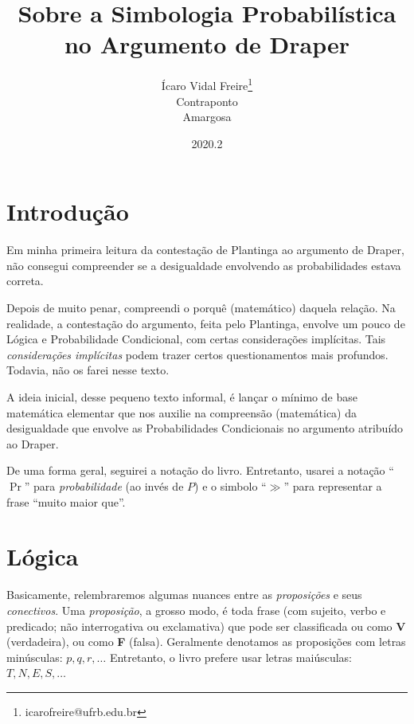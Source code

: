 \documentclass[12pt]{article}
\title
 {
  \textbf{Sobre a Simbologia Probabilística no Argumento de Draper}
 }
\author
 {
	 Ícaro Vidal Freire\thanks{icarofreire@ufrb.edu.br}\\
		Contraponto\\ 
		Amargosa
	}
\date{2020.2}
\theoremstyle{definition}
\begin{document}
\maketitle
%
 \tableofcontents
	\newpage

\section{Introdução}
Em minha primeira leitura da contestação de Plantinga ao argumento de Draper,
não consegui compreender se a desigualdade envolvendo as probabilidades estava 
correta.

Depois de muito penar, compreendi o porquê (matemático) daquela relação.
Na realidade, a contestação do argumento, feita pelo Plantinga, envolve um pouco
de Lógica e Probabilidade Condicional, com certas considerações implícitas.
Tais \textit{considerações implícitas} podem trazer certos questionamentos mais
profundos.
Todavia, não os farei nesse texto.

A ideia inicial, desse pequeno texto informal, é lançar o mínimo de base 
matemática elementar que nos auxilie na compreensão (matemática) da desigualdade
que envolve as Probabilidades Condicionais no argumento atribuído ao Draper.

De uma forma geral, seguirei a notação do livro. 
Entretanto, usarei a notação ``$\Pr$'' para \textit{probabilidade} (ao invés de
$P$) e o simbolo ``$\gg$'' para representar a frase ``muito maior que''.

\section{Lógica}
Basicamente, relembraremos algumas nuances entre as \textit{proposições} e seus
\textit{conectivos}.
Uma \textit{proposição}, a grosso modo, é toda frase (com sujeito, verbo e 
predicado; não interrogativa ou exclamativa) que pode ser classificada ou como 
\textbf{V} (verdadeira), ou como \textbf{F} (falsa). 
Geralmente denotamos as proposições com letras minúsculas: $p, q, r, \ldots$
Entretanto, o livro prefere usar letras maiúsculas: $T, N, E, S,\ldots$
\end{document}
